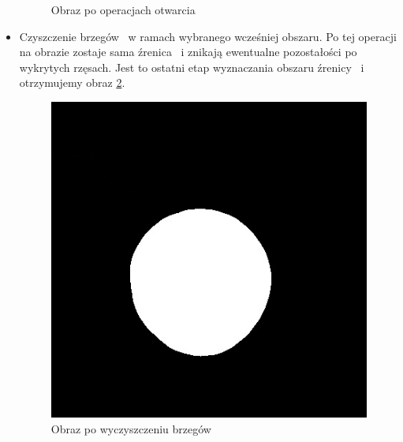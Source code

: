 \begin{itemize}
\begin{figure}
\begin{center}
\caption{Obraz po operacjach otwarcia}
\label{fig:otwarcie2}
\end{center}
\end{figure}
\item Czyszczenie brzegów ~w ramach wybranego wcześniej obszaru. Po tej operacji na obrazie zostaje sama źrenica ~i znikają ewentualne pozostałości po wykrytych rzęsach. Jest to ostatni etap wyznaczania obszaru źrenicy ~i otrzymujemy obraz \ref{fig:zrenica2}.
\begin{figure}
\begin{center}
\includegraphics[scale=0.5]{roi2.jpg}
\caption{Obraz po wyczyszczeniu brzegów}
\label{fig:zrenica2}
\end{center}
\end{figure}
\end{itemize}


